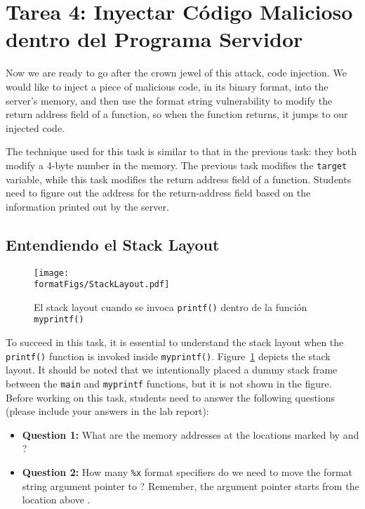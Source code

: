 \section{Tarea 4: Inyectar Código Malicioso dentro del Programa Servidor}

Now we are ready to go after the crown jewel of this attack, code injection. 
We would like to inject a piece of malicious code, in its binary format, 
into the server's memory, and then use the format string vulnerability 
to modify the return address field of a function, so when the function returns, 
it jumps to our injected code. 

The technique used for this task is similar to that in the previous task:
they both modify a 4-byte number in the memory. The previous task
modifies the \texttt{target} variable, while this task modifies the return
address field of a function. Students need to figure out the address
for the return-address field based on the information printed out 
by the server. 


\subsection{Entendiendo el Stack Layout} 

\begin{figure}[htb]
\begin{center}
\texttt{[image: \\formatFigs/StackLayout.pdf]}
\end{center}
\caption{El stack layout cuando se invoca \texttt{printf()}
dentro de la función \texttt{myprintf()}}
\label{format:fig:stacklayout}
\end{figure}

To succeed in this task, it is essential to understand the stack layout when
the \texttt{printf()} function is invoked inside \texttt{myprintf()}. 
Figure~\ref{format:fig:stacklayout} depicts the stack layout. 
It should be noted that we intentionally placed a dummy stack frame between
the \texttt{main} and \texttt{myprintf} functions, but it is not shown in the
figure. Before working on this task, students need to
answer the following questions (please include your answers
in the lab report): 


\begin{itemize}[noitemsep]
\item \textbf{Question 1:}  What are the memory addresses at the locations marked by
 and ?

\item \textbf{Question 2:} How many \texttt{\%x} format specifiers do we 
need to move the format string argument pointer to ? Remember, 
the argument pointer starts from the location above . 
\end{itemize} 



